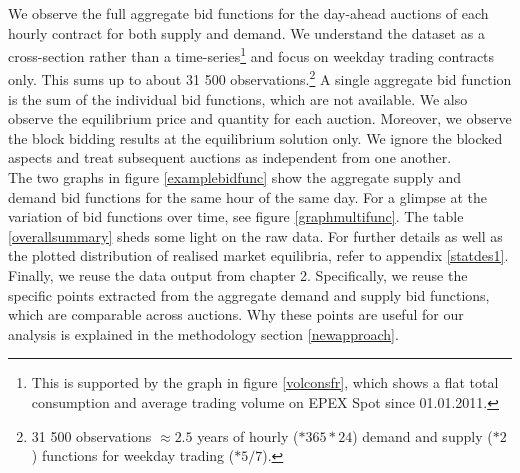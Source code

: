 We observe the full aggregate bid functions for the day-ahead auctions of each hourly contract for both supply and demand. 
We understand the dataset as a cross-section rather than a time-series\footnote{This is supported by the graph in figure \ref{volconsfr}, which shows a flat total consumption and average trading volume on EPEX Spot since 01.01.2011.} and focus on weekday trading contracts only. 
This sums up to about 31 500 observations.\footnote{31 500 observations $\approx 2.5$ years of hourly ($*365 *24$) demand and supply ($*2$) functions for weekday trading ($*5/7$).} A single aggregate bid function is the sum of the individual bid functions, which are not available. %
We also observe the equilibrium price and quantity for each auction. Moreover, we observe the block bidding results at the equilibrium solution only. We ignore the blocked aspects and treat subsequent auctions as independent from one another.\\
	
The two graphs in figure \ref{examplebidfunc} show the aggregate supply and demand bid functions for the same hour of the same day. For a glimpse at the variation of bid functions over time, see figure \ref{graphmultifunc}. The table \ref{overallsummary} sheds some light on the raw data. For further details as well as the plotted distribution of realised market equilibria, refer to appendix \ref{statdes1}. \\

Finally, we reuse the data output from chapter 2. Specifically, we reuse the specific points extracted from the aggregate demand and supply bid functions, which are comparable across auctions. Why these points are useful for our analysis is explained in the methodology section \ref{newapproach}.

